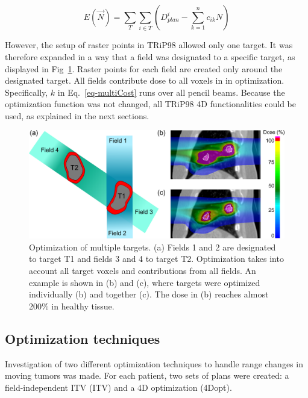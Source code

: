 \documentclass[type=dr, dr=rernat, accentcolor=tud7b,colorbacktitle, bigchapter, openright, twoside, 12pt ]{tudthesis}
\begin{document}
\begin{equation}
\label{eq-multiCost}
 E(\vec{N}) = \sum_{T} \sum_{i\in T} \left( D_{plan}^{i} -\sum_{k=1}^n c_{ik}N\right)
\end{equation}

However, the setup of raster points in TRiP98 allowed only one target. It was therefore expanded in a way that a field was designated to a specific target, as displayed in Fig~\ref{Fig:multiTargets}. 
Raster points for each field are created only around the designated target. All fields contribute dose to all voxels in in optimization. Specifically, $k$ in Eq.~\ref{eq-multiCost} runs over all pencil beams. 
Because the optimization function was not changed, 
all TRiP98 4D functionalities could be used, as explained in the next sections.




\newpage


\begin{figure}[H]
	\begin{center}
		\includegraphics[width=1\textwidth]{./Images/multiTarget.png}
		\caption{Optimization of multiple targets. (a) Fields 1 and 2 are designated to target T1 and fields 3 and 4 to target T2. 
		Optimization takes into account all target voxels and contributions from all fields. An example is shown in (b) and (c), where targets
		were optimized individually (b) and together (c). The dose in (b) reaches almost 200\% in healthy tissue.}
		\label{Fig:multiTargets}
	\end{center}
\end{figure}



\subsection{Optimization techniques}

Investigation of two different optimization techniques to handle range changes in moving tumors was made. For each patient, two sets of plans were created: a field-independent ITV (ITV) and a 4D optimization (4Dopt). 
\end{document}
